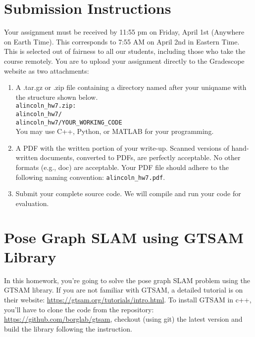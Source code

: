 \documentclass[tp]{lcc}
\begin{document}
\maketitle





\section*{Submission Instructions}
Your assignment must be received by 11:55 pm on Friday, April 1st (Anywhere on Earth Time). This corresponds to 7:55 AM on April 2nd in Eastern Time. This is selected out of fairness to all our students, including those who take the course remotely. You are to upload your assignment directly to the Gradescope website as two attachments:

\begin{enumerate}
    \item A .tar.gz or .zip file containing a directory named after your uniqname with the structure shown below. \\
    \texttt{alincoln\_hw7.zip:} \\
    \texttt{alincoln\_hw7/} \\
    \texttt{alincoln\_hw7/YOUR\_WORKING\_CODE} \\
    You may use C++, Python, or MATLAB for your programming.

    \item A PDF with the written portion of your write-up. Scanned versions of hand-written documents, converted to PDFs, are perfectly acceptable. No other formats (e.g., doc) are acceptable. Your PDF file should adhere to the following naming convention: \texttt{alincoln\_hw7.pdf}.

    \item Submit your complete source code. We will compile and run your code for evaluation.
\end{enumerate}

\section{Pose Graph SLAM using GTSAM Library}
In this homework, you’re going to solve the pose graph SLAM problem using the GTSAM library. If you are not familiar with GTSAM, a detailed tutorial is on their website: \url{https://gtsam.org/tutorials/intro.html}. To install GTSAM in c++, you’ll have to clone the code from the repository: \url{https://github.com/borglab/gtsam}, checkout (using git) the latest version and build the library following the instruction.
\end{document}
